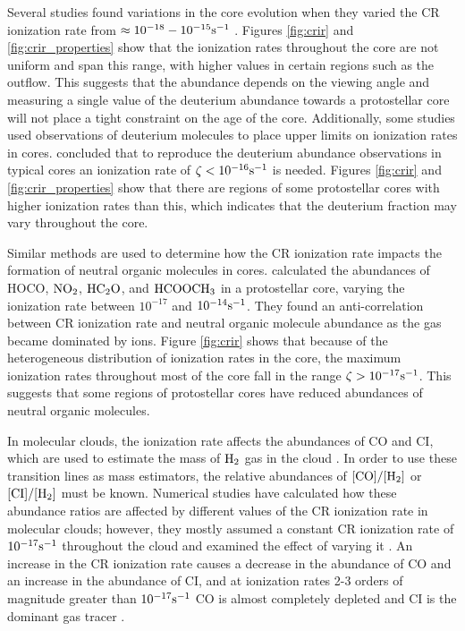 \documentclass[twocolumn]{aastex63}
\begin{document}
Several studies found variations in the core evolution when they varied the CR ionization rate from $\approx 10^{-18}- 10^{-15} \rm s^{-1}$ \citep{crapsi_2005_deuterium, pagani_2009_deuterium, fontani_2011_deuterium, pagani_2013_deuterium, brunken_2014_deuterium, kong_2015_deuterium, kong_2016_deuterium}. Figures \ref{fig:crir} and \ref{fig:crir_properties} show that the ionization rates throughout the core are not uniform and span this range, with higher values in certain regions such as the outflow. This suggests that the abundance depends on the viewing angle and measuring a single value of the deuterium abundance towards a protostellar core will not place a tight constraint on the age of the core. Additionally, some studies used observations of deuterium molecules to place upper limits on ionization rates in cores. \cite{kong_2015_deuterium} concluded that to reproduce the deuterium abundance observations in typical cores an ionization rate of $\zeta<10^{-16} \rm s^{-1}$ is needed. Figures \ref{fig:crir} and \ref{fig:crir_properties} show that there are regions of some protostellar cores with higher ionization rates than this, which indicates that the deuterium fraction may vary throughout the core.

Similar methods are used to determine how the CR ionization rate impacts the formation of neutral organic molecules in cores. \cite{shingledecker_2018_tmc1} calculated the abundances of HOCO, $\rm NO_2$, $\rm HC_2O$, and $\rm HCOOCH_3$ in a protostellar core, varying the ionization rate between $10^{-17}$ and $10^{-14} \rm s^{-1}$. They found an anti-correlation between CR ionization rate and neutral organic molecule abundance as the gas became dominated by ions. Figure \ref{fig:crir} shows that because of the heterogeneous distribution of ionization rates in the core, the maximum ionization rates throughout most of the core fall in the range $\zeta > 10^{-17} \rm s^{-1}$. This suggests that some regions of protostellar cores have reduced abundances of neutral organic molecules. 

In molecular clouds, the ionization rate affects the abundances of CO and CI, which are used to estimate the mass of $\rm H_2$ gas in the cloud \citep{papadopoulos_2004_C1, bollato_2013_CO, bisbas_2015_chemistry}. In order to use these transition lines as mass estimators, the relative abundances of $[\rm CO]/[\rm H_2]$ or $[\rm CI]/[\rm H_2]$ must be known. Numerical studies have calculated how these abundance ratios are affected by different values of the CR ionization rate in molecular clouds; however, they mostly assumed a constant CR ionization rate of $10^{-17} \rm s^{-1}$ throughout the cloud and examined the effect of varying it \citep{glover_2012_chemistry, offner_2013_chemistry, offner_2014_chemistry, glover_2015_chemistry_c1, glover_2016_chemistry_c1, bisbas_2017_chemistry}. An increase in the CR ionization rate causes a decrease in the abundance of CO and an increase in the abundance of CI, and at ionization rates 2-3 orders of magnitude greater than $10^{-17} \rm s^{-1}$ CO is almost completely depleted and CI is the dominant gas tracer \citep{glover_2012_chemistry, bisbas_2017_chemistry, gaches_2019_mc2}. 
\end{document}
